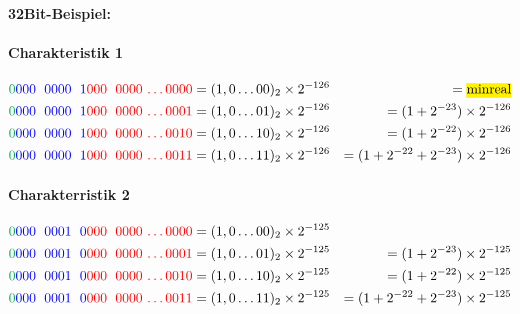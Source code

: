 \documentclass[a4paper]{scrartcl}
\begin{document}
 	\paragraph{32Bit-Beispiel:}
 	\paragraph{Charakteristik 1}
 	\begin{align*}
 		\text{\textcolor{Green}{$$0$$}} \text{\textcolor{blue}{$$000\; 0000\; 1$$}} \text{\textcolor{red}{$$000\; 0000 \dots 0000$$}} & = (1,0 \dots 00)_2 \times 2^{-126} &= \text{\hl{minreal}}  \\
 		\text{\textcolor{Green}{$$0$$}} \text{\textcolor{blue}{$$000\; 0000\; 1$$}} \text{\textcolor{red}{$$000\; 0000 \dots 0001$$}} & = (1,0 \dots 01)_2 \times 2^{-126} &= (1+2^{-23}) \times 2^{-126}  \\
 		\text{\textcolor{Green}{$$0$$}}\text{\textcolor{blue}{$$000\; 0000\; 1$$}}  \text{\textcolor{red}{$$000\; 0000 \dots 0010$$}} & = (1,0 \dots 10)_2 \times 2^{-126} &=  (1+2^{-22}) \times 2^{-126} \\
 		\text{\textcolor{Green}{$$0$$}} \text{\textcolor{blue}{$$000\; 0000\; 1$$}} \text{\textcolor{red}{$$000\; 0000 \dots 0011$$}} & = (1,0 \dots 11)_2 \times 2^{-126} &= (1+2^{-22} + 2^{-23} ) \times 2^{-126} \\
 	\end{align*}
 	
 	\paragraph{Charakterristik 2}
	\begin{align*}
		\text{\textcolor{Green}{$$0$$}} \text{\textcolor{blue}{$$000\; 0001\; 0$$}} \text{\textcolor{red}{$$000\; 0000 \dots 0000$$}} & = (1,0 \dots 00)_2 \times 2^{-125}  \\
		\text{\textcolor{Green}{$$0$$}} \text{\textcolor{blue}{$$000\; 0001\; 0$$}} \text{\textcolor{red}{$$000\; 0000 \dots 0001$$}} & = (1,0 \dots 01)_2 \times 2^{-125} &= (1+2^{-23}) \times 2^{-125}  \\
		\text{\textcolor{Green}{$$0$$}}\text{\textcolor{blue}{$$000\; 0001\; 0$$}}  \text{\textcolor{red}{$$000\; 0000 \dots 0010$$}} & = (1,0 \dots 10)_2 \times 2^{-125} &=  (1+2^{-22}) \times 2^{-125} \\
		\text{\textcolor{Green}{$$0$$}} \text{\textcolor{blue}{$$000\; 0001\; 0$$}} \text{\textcolor{red}{$$000\; 0000 \dots 0011$$}} & = (1,0 \dots 11)_2 \times 2^{-125} &= (1+2^{-22} + 2^{-23} ) \times 2^{-125} \\ 
	\end{align*}
\end{document}

